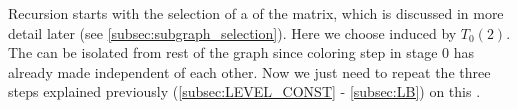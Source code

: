 Recursion starts with the selection of a \subgraph of the matrix, which is discussed in more detail later (see \cref{subsec:subgraph_selection}). Here we choose \subgraph induced by $T_0(2)$. The  \subgraph can be isolated from rest of the graph since  \DONE coloring step in stage 0 has already made \levelGroups independent of each other. Now we just need to repeat the three steps explained previously (\cref{subsec:LEVEL_CONST} - \cref{subsec:LB}) on this \subgraph.
   
     \begin{figure}[thbp]
     	\centering
     	\hspace{2.25em}
     	\hspace{1.75em}
     	\hspace{1.75em}

\end{figure}
